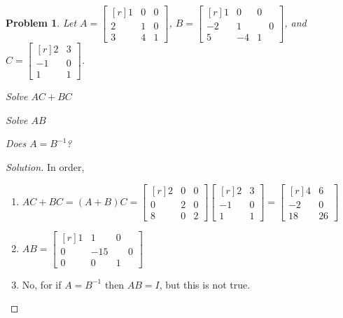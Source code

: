 \documentclass[oneside]{book}
\theoremstyle{mystyle}
\newtheorem{problem}{Problem}[section]
\begin{document}
\begin{problem}
Let $A = \begin{bmatrix*}[r] 1 & 0 & 0 \\ 2 & 1 & 0 \\ 3 & 4 & 1 \end{bmatrix*}$, $B=\begin{bmatrix*}[r]1 & 0 & 0 \\ -2 & 1 & \phantom{-}0 \\ 5 & -4 & 1 \end{bmatrix*}$, and $C = \begin{bmatrix*}[r] 2 & 3 \\ -1 & 0 \\ 1 & 1 \end{bmatrix*}$. 
\begin{enumerate}
\begin{multicols}{3}
    \item Solve $AC+BC$
    \item Solve $AB$
    \item Does $A = B^{-1}$?
\end{multicols}
\end{enumerate}
\end{problem}
\begin{proof}[Solution]
In order,
\begin{enumerate}
    \item $AC+BC = (A+B)C = \begin{bmatrix*}[r] 2 & 0 & 0 \\ 0 & 2 & 0 \\ 8 & 0 & 2 \end{bmatrix*} \begin{bmatrix*}[r] 2 & 3 \\ -1 & 0 \\ 1 & 1 \end{bmatrix*} = \begin{bmatrix*}[r] 4 & 6 \\ -2 & 0 \\ 18 & 26 \end{bmatrix*}$
    \item $AB = \begin{bmatrix*}[r] 1 & 1 & 0 \\ 0 & -15 & \phantom{-}0 \\ 0 & 0 & 1 \end{bmatrix*}$
    \item No, for if $A=B^{-1}$ then $AB=I$, but this is not true.
\end{enumerate}
\end{proof}
\end{document}
